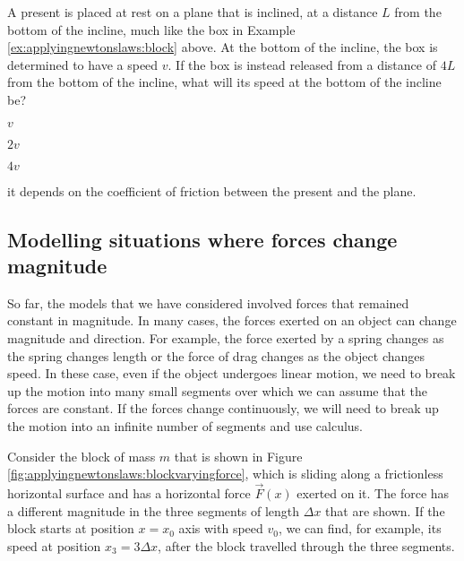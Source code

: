 \begin{checkpoint}
\begin{MCquestion}{A present is placed at rest on a plane that is inclined, at a distance $L$ from the bottom of the incline, much like the box in Example \ref{ex:applyingnewtonslaws:block} above. At the bottom of the incline, the box is determined to have a speed $v$. If the box is instead released from a distance of $4L$ from the bottom of the incline, what will its speed at the bottom of the incline be?}
\item $v$
\item $2v$\correct
\item $4v$
\item it depends on the coefficient of friction between the present and the plane.
\end{MCquestion}
\end{checkpoint}


\subsection{Modelling situations where forces change magnitude}
So far, the models that we have considered involved forces that remained constant in magnitude. In many cases, the forces exerted on an object can change magnitude and direction. For example, the force exerted by a spring changes as the spring changes length or the force of drag changes as the object changes speed. In these case, even if the object undergoes linear motion, we need to break up the motion into many small segments over which we can assume that the forces are constant. If the forces change continuously, we will need to break up the motion into an infinite number of segments and use calculus.

Consider the block of mass $m$ that is shown in Figure \ref{fig:applyingnewtonslaws:blockvaryingforce}, which is sliding along a frictionless horizontal surface and has a  horizontal force $\vec F(x)$ exerted on it. The force has a different magnitude in the three segments of length $\Delta x$ that are shown. If the block starts at position $x=x_0$ axis with speed $v_0$, we can find, for example, its speed at position $x_3=3\Delta x$, after the block travelled through the three segments.


